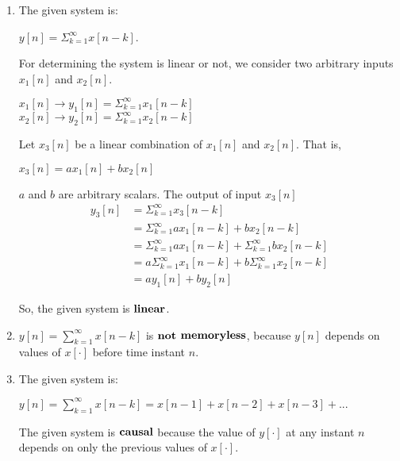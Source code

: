 \documentclass[10pt,a4paper, margin=1in]{article}
\begin{document}
\begin{enumerate}
\begin{enumerate}
\begin{enumerate}
        
        \item
        The given system is: 
        \begin{center}
            $y[n] = \Sigma^{\infty}_{k=1} x[n-k]$.
        \end{center} 
        For determining the system is linear or not, we consider two arbitrary inputs $x_1[n]$ and $x_2[n]$.
        \begin{center}
            $x_1[n] \to y_1[n] = \Sigma^{\infty}_{k=1} x_1[n-k]$\\
            $x_2[n] \to y_2[n] = \Sigma^{\infty}_{k=1} x_2[n-k]$\\
        \end{center}
        Let $x_3[n]$ be a linear combination of $x_1[n]$ and $x_2[n]$. That is, 
        \begin{center}
            $x_3[n] = ax_1[n] + bx_2[n]$
        \end{center}
        $a$ and $b$ are arbitrary scalars. The output of input $x_3[n]$
        \begin{equation}
            \begin{split}
                y_3[n] &= \Sigma^{\infty}_{k=1}x_3[n - k] \\
                &= \Sigma^{\infty}_{k=1}ax_1[n-k]+bx_2[n-k]   \\
                &= \Sigma^{\infty}_{k=1}ax_1[n-k] +\Sigma^{\infty}_{k=1}bx_2[n-k]  \\     
                &= a \Sigma^{\infty}_{k=1}x_1[n-k] +b \Sigma^{\infty}_{k=1}x_2[n-k]  \\ 
                &= a y_1[n] + by_2[n]
            \end{split}
        \end{equation}
        
        
        \begin{center}
            
        \end{center}
        So, the given system is $\bold{linear}$.\\  
    
        \item
        $y[n]=\sum^{\infty}_{k=1}x[n-k]$ is $\bold{not}$ $\bold{memoryless}$, because $y[n]$ depends on values of $x[\cdot]$ before time instant $n$.\\
        
        \item
        The given system is:
        \begin{center}
            $y[n]=\sum^{\infty}_{k=1}x[n-k]=x[n-1]+x[n-2]+x[n-3]+...$
        \end{center}
        The given system is $\bold{causal}$ because the value of $y[\cdot]$ at any instant $n$ depends on only the previous values of $x[\cdot]$.
        

\end{enumerate}
\end{enumerate}
\end{enumerate}
\end{document}
